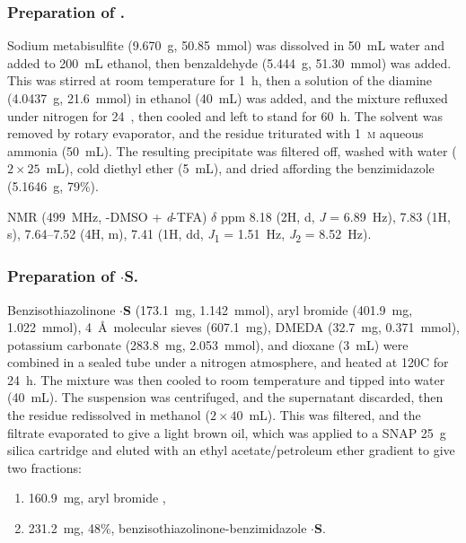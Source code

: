 \begin{refsection}
\subsubsection{Preparation of .}
Sodium metabisulfite (9.670~g, 50.85~mmol) was dissolved in 50~mL water and added to 200~mL ethanol, then benzaldehyde (5.444~g, 51.30~mmol) was added.
This was stirred at room temperature for 1~h, then a solution of the diamine  (4.0437~g, 21.6~mmol) in ethanol (40~mL) was added, and the mixture refluxed under nitrogen for 24~, then cooled and left to stand for 60~h.
The solvent was removed by rotary evaporator, and the residue triturated with 1~\textsc{m} aqueous ammonia (50~mL). 
The resulting precipitate was filtered off, washed with water ($2\times25$~mL), cold diethyl ether (5~mL), and dried affording the benzimidazole  (5.1646~g, 79\%).

 NMR (499~MHz, -DMSO + \textit{d}-TFA) $\delta$ ppm 8.18 (2H, d, \emph{J} = 6.89~Hz), 7.83 (1H, s), 7.64--7.52 (4H, m), 7.41 (1H, dd, \emph{J}\textsubscript{1} = 1.51~Hz, \emph{J}\textsubscript{2} = 8.52~Hz).

\subsubsection{Preparation of \texorpdfstring{$\cdot$\textbf{S}}{.S}.}
Benzisothiazolinone $\cdot$\textbf{S} (173.1~mg, 1.142~mmol), aryl bromide  (401.9~mg, 1.022~mmol), 4~\AA\ molecular sieves (607.1~mg), DMEDA (32.7~mg, 0.371~mmol), potassium carbonate (283.8~mg, 2.053~mmol), and dioxane (3~mL) were combined in a sealed tube under a nitrogen atmosphere, and heated at 120\degree{}C for 24~h.
The mixture was then cooled to room temperature and tipped into water (40~mL).
The suspension was centrifuged, and the supernatant discarded, then the residue redissolved in methanol ($2\times40$~mL).
This was filtered, and the filtrate evaporated to give a light brown oil, which was applied to a SNAP 25~g silica cartridge and eluted with an ethyl acetate/petroleum ether gradient to give two fractions:
\begin{enumerate}
    \item 160.9~mg, aryl bromide ,
    \item 231.2~mg, 48\%, benzisothiazolinone-benzimidazole $\cdot$\textbf{S}.
\end{enumerate}


\end{refsection}
